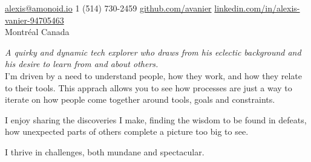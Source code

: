 \documentclass[10pt,letterpaper]{article}
\begin{document}
\sloppy  %



\nobreakvspace{0.3em}  %

\noindent\href{mailto:alexis.at.amonoid.io}{alexis\mbox{}@\mbox{}amonoid.io}\sbull
\textsmaller{+}1 (514) 730-2459\sbull
\href{https://github.com/avanier}{github.com/avanier}\sbull
\href{https://www.linkedin.com/in/alexis-vanier-94705463}{linkedin.com/in/alexis-vanier-94705463}
\\
Montréal\sbull
Canada

\spacedhrule{0.9em}{-0.4em}  %


\vspace{-0.5em}  %
\begin{multicols}{2}  %
\noindent \emph{A quirky and dynamic tech explorer who draws from his eclectic background and his desire to learn from and about others.}
\\

I'm driven by a need to understand people, how they work, and how they relate to their tools. This apprach allows you to see how processes are just a way to iterate on how people come together around tools, goals and constraints.

I enjoy sharing the discoveries I make, finding the wisdom to be found in defeats, how unexpected parts of others complete a picture too big to see.

I thrive in challenges, both mundane and spectacular.
\end{multicols}


\spacedhrule{0em}{0em}

\end{document}
